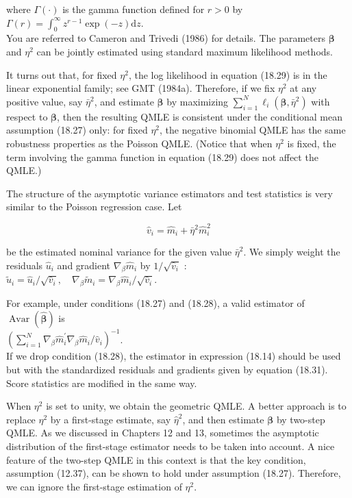 \documentclass[10pt]{article}
\begin{document}
where $\Gamma(\cdot)$ is the gamma function defined for $r>0$ by $\Gamma(r)=\int_{0}^{\infty} z^{r-1} \exp (-z) \mathrm{d} z$.\\
You are referred to Cameron and Trivedi (1986) for details. The parameters $\boldsymbol{\beta}$ and $\eta^{2}$ can be jointly estimated using standard maximum likelihood methods.

It turns out that, for fixed $\eta^{2}$, the log likelihood in equation (18.29) is in the linear exponential family; see GMT (1984a). Therefore, if we fix $\eta^{2}$ at any positive value, say $\bar{\eta}^{2}$, and estimate $\boldsymbol{\beta}$ by maximizing $\sum_{i=1}^{N} \ell_{i}\left(\boldsymbol{\beta}, \bar{\eta}^{2}\right)$ with respect to $\boldsymbol{\beta}$, then the resulting QMLE is consistent under the conditional mean assumption (18.27) only: for fixed $\eta^{2}$, the negative binomial QMLE has the same robustness properties as the Poisson QMLE. (Notice that when $\eta^{2}$ is fixed, the term involving the gamma function in equation (18.29) does not affect the QMLE.)

The structure of the asymptotic variance estimators and test statistics is very similar to the Poisson regression case. Let


\begin{equation*}
\hat{v}_{i}=\hat{m}_{i}+\bar{\eta}^{2} \hat{m}_{i}^{2} \tag{18.30}
\end{equation*}


be the estimated nominal variance for the given value $\bar{\eta}^{2}$. We simply weight the residuals $\hat{u}_{i}$ and gradient $\nabla_{\beta} \hat{m}_{i}$ by $1 / \sqrt{\hat{v}_{i}}$ :\\
$\tilde{u}_{i}=\hat{u}_{i} / \sqrt{\hat{v}_{i}}, \quad \nabla_{\beta} \tilde{m}_{i}=\nabla_{\beta} \hat{m}_{i} / \sqrt{\hat{v}_{i}}$.

For example, under conditions (18.27) and (18.28), a valid estimator of $\operatorname{Avar}(\hat{\boldsymbol{\beta}})$ is\\
$\left(\sum_{i=1}^{N} \nabla_{\beta} \hat{m}_{i}^{\prime} \nabla_{\beta} \hat{m}_{i} / \hat{v}_{i}\right)^{-1}$.\\
If we drop condition (18.28), the estimator in expression (18.14) should be used but with the standardized residuals and gradients given by equation (18.31). Score statistics are modified in the same way.

When $\eta^{2}$ is set to unity, we obtain the geometric QMLE. A better approach is to replace $\eta^{2}$ by a first-stage estimate, say $\hat{\eta}^{2}$, and then estimate $\boldsymbol{\beta}$ by two-step QMLE. As we discussed in Chapters 12 and 13, sometimes the asymptotic distribution of the first-stage estimator needs to be taken into account. A nice feature of the two-step QMLE in this context is that the key condition, assumption (12.37), can be shown to hold under assumption (18.27). Therefore, we can ignore the first-stage estimation of $\eta^{2}$.
\end{document}

